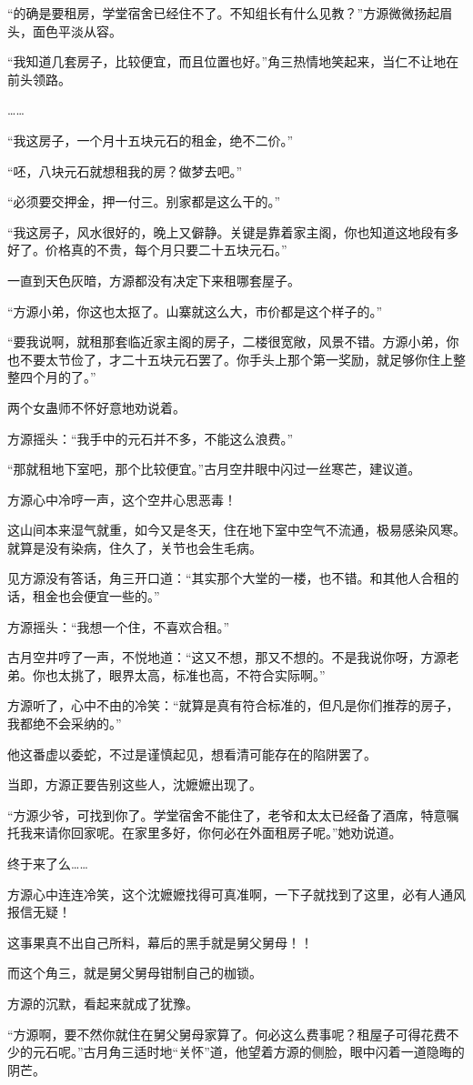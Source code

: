 \begin{this_body}
“的确是要租房，学堂宿舍已经住不了。不知组长有什么见教？”方源微微扬起眉头，面色平淡从容。

“我知道几套房子，比较便宜，而且位置也好。”角三热情地笑起来，当仁不让地在前头领路。

……

“我这房子，一个月十五块元石的租金，绝不二价。”

“呸，八块元石就想租我的房？做梦去吧。”

“必须要交押金，押一付三。别家都是这么干的。”

“我这房子，风水很好的，晚上又僻静。关键是靠着家主阁，你也知道这地段有多好了。价格真的不贵，每个月只要二十五块元石。”

一直到天色灰暗，方源都没有决定下来租哪套屋子。

“方源小弟，你这也太抠了。山寨就这么大，市价都是这个样子的。”

“要我说啊，就租那套临近家主阁的房子，二楼很宽敞，风景不错。方源小弟，你也不要太节俭了，才二十五块元石罢了。你手头上那个第一奖励，就足够你住上整整四个月的了。”

两个女蛊师不怀好意地劝说着。

方源摇头：“我手中的元石并不多，不能这么浪费。”

“那就租地下室吧，那个比较便宜。”古月空井眼中闪过一丝寒芒，建议道。

方源心中冷哼一声，这个空井心思恶毒！

这山间本来湿气就重，如今又是冬天，住在地下室中空气不流通，极易感染风寒。就算是没有染病，住久了，关节也会生毛病。

见方源没有答话，角三开口道：“其实那个大堂的一楼，也不错。和其他人合租的话，租金也会便宜一些的。”

方源摇头：“我想一个住，不喜欢合租。”

古月空井哼了一声，不悦地道：“这又不想，那又不想的。不是我说你呀，方源老弟。你也太挑了，眼界太高，标准也高，不符合实际啊。”

方源听了，心中不由的冷笑：“就算是真有符合标准的，但凡是你们推荐的房子，我都绝不会采纳的。”

他这番虚以委蛇，不过是谨慎起见，想看清可能存在的陷阱罢了。

当即，方源正要告别这些人，沈嬷嬷出现了。

“方源少爷，可找到你了。学堂宿舍不能住了，老爷和太太已经备了酒席，特意嘱托我来请你回家呢。在家里多好，你何必在外面租房子呢。”她劝说道。

终于来了么……

方源心中连连冷笑，这个沈嬷嬷找得可真准啊，一下子就找到了这里，必有人通风报信无疑！

这事果真不出自己所料，幕后的黑手就是舅父舅母！！

而这个角三，就是舅父舅母钳制自己的枷锁。

方源的沉默，看起来就成了犹豫。

“方源啊，要不然你就住在舅父舅母家算了。何必这么费事呢？租屋子可得花费不少的元石呢。”古月角三适时地“关怀”道，他望着方源的侧脸，眼中闪着一道隐晦的阴芒。

\end{this_body}

